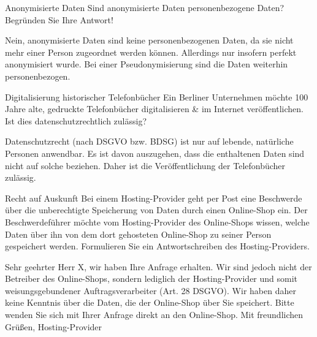 \documentclass{exercisesheet}
\begin{document}
\begin{exercise}{Anonymisierte Daten}
  Sind anonymisierte Daten personenbezogene Daten? Begründen Sie Ihre Antwort!

  \begin{solution}
    Nein, anonymisierte Daten sind keine personenbezogenen Daten, da sie nicht mehr einer Person zugeordnet werden können. Allerdings nur insofern perfekt anonymisiert wurde. Bei einer Pseudonymisierung sind die Daten weiterhin personenbezogen.
  \end{solution}
\end{exercise}

\begin{exercise}{Digitalisierung historischer Telefonbücher}
  Ein Berliner Unternehmen möchte 100 Jahre alte, gedruckte Telefonbücher digitalisieren \& im Internet veröffentlichen. Ist dies datenschutzrechtlich zulässig?

  \begin{solution}
    Datenschutzrecht (nach DSGVO bzw. BDSG) ist nur auf lebende, natürliche Personen anwendbar. Es ist davon auszugehen, dass die enthaltenen Daten sind nicht auf solche beziehen. Daher ist die Veröffentlichung der Telefonbücher zulässig.
  \end{solution}
\end{exercise}

\begin{exercise}{Recht auf Auskunft}
  Bei einem Hosting-Provider geht per Post eine Beschwerde über die unberechtigte Speicherung von Daten durch einen Online-Shop ein. Der Beschwerdeführer möchte vom Hosting-Provider des Online-Shops wissen, welche Daten über ihn von dem dort gehosteten Online-Shop zu seiner Person gespeichert werden.\newline
  Formulieren Sie ein Antwortschreiben des Hosting-Providers.

  \begin{solution}
    Sehr geehrter Herr X,\newline
    wir haben Ihre Anfrage erhalten. Wir sind jedoch nicht der Betreiber des Online-Shops, sondern lediglich der Hosting-Provider und somit weisungsgebundener Auftragsverarbeiter (Art. 28 DSGVO). Wir haben daher keine Kenntnis über die Daten, die der Online-Shop über Sie speichert. Bitte wenden Sie sich mit Ihrer Anfrage direkt an den Online-Shop.\newline
    Mit freundlichen Grüßen,\newline
    Hosting-Provider
  \end{solution}
\end{exercise}
\end{document}
